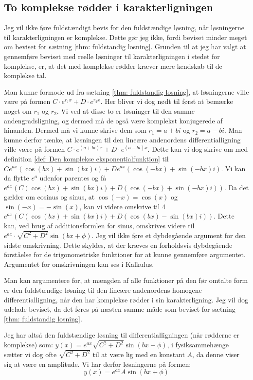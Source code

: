 \subsection{To komplekse rødder i karakterligningen}
\label{teori: Komplekse losninger i karakterligningen}
Jeg vil ikke føre fuldstændigt bevis for den fuldstændige løsning, når løsningerne til karakterligningen er komplekse. 
Dette gør jeg ikke, fordi beviset minder meget om beviset for sætning \ref{thm: fuldstandig losning}.
Grunden til at jeg har valgt at gennemføre beviset med reelle løsninger til karakterligningen i stedet for komplekse, er, at det med komplekse rødder kræver mere kendskab til de komplekse tal.

Man kunne formode ud fra sætning \ref{thm: fuldstandig losning}, at løsningerne ville være på formen $C\cdot e^{r_1 x} + D \cdot e^{r_2 x}$.
Her bliver vi dog nødt til først at bemærke noget om $r_1$ og $r_2$.
Vi ved at disse to er løsninger til den samme andengradsligning, og dermed må de også være komplekst konjugerede af hinanden. 
Dermed må vi kunne skrive dem som $r_1 = a + bi$ og $r_2 = a-bi$. 
Man kunne derfor tænke, at løsningen til den lineære andenordens differentialligning ville være på formen $C\cdot e^{(a+bi) x} + D \cdot e^{(a-bi)x}$.
Dette kan vi dog skrive om med definition \ref{def: Den komplekse eksponentialfunktion} til $Ce^{ax}(\cos(bx) + \sin(bx) i) + De^{ax}(\cos(-bx) + \sin(-bx) i)$.
Vi kan da flytte $e^{a}$ udenfor parentes og få 
$e^{ax}(C(\cos(bx) + \sin(bx) i) + D(\cos(-bx) + \sin(-bx) i))$.
Da det gælder om cosinus og sinus, at $\cos(-x)=\cos(x)$ og $\sin(-x)=-\sin(x)$, kan vi videre omskrive til 4
$e^{ax}(C(\cos(bx) + \sin(bx) i) + D(\cos(bx) - \sin(bx) i))$. 
Dette kan, ved brug af additionsformlen for sinus, omskrives videre til $e^{ax}\cdot \sqrt{C^2 + D^2}\sin(bx+\phi)$. 
Jeg vil ikke føre et dybdegående argument for den sidste omskrivning.
Dette skyldes, at der kræves en forholdsvis dybdegående forståelse for de trigonometriske funktioner for at kunne gennemføre argumentet. 
Argumentet for omskrivningen kan ses i Kalkulus.

Man kan argumentere for, at mængden af alle funktioner på den før omtalte form er den fuldstændige løsning til den lineære andenordens homogene differentialligning, når den har komplekse rødder i sin karakterligning. 
Jeg vil dog udelade beviset, da det føres på næsten samme måde som beviset for sætning \ref{thm: fuldstandig losning}. 

Jeg har altså den fuldstændige løsning til differentialligningen (når rødderne er komplekse) som:
$y(x) = e^{ax}\sqrt{C^2 + D^2}\sin(bx+\phi)$, i fysiksammehænge sætter vi dog ofte $\sqrt{C^2 + D^2}$ til at være lig med en konstant $A$, da denne viser sig at være en amplitude. 
Vi har derfor løsningerne på formen:
$$y(x) = e^{ax}A\sin(bx+\phi)$$


